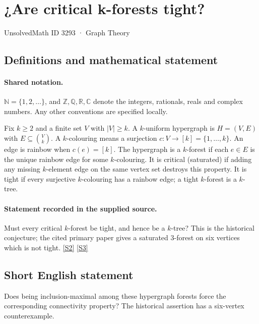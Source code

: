 \documentclass[11pt]{article}
\newcommand{\sref}[2]{\hyperlink{source:#1:#2}{[S#2]}}
\begin{document}
\setcounter{section}{3292}
\section{¿Are critical k-forests tight?}\label{3293}
{\small\sffamily UnsolvedMath ID 3293 · Graph Theory}
\subsection{Definitions and mathematical statement}

\paragraph{Shared notation.}$\mathbb N=\{1,2,\ldots\}$, and $\mathbb Z,\mathbb Q,\mathbb R,\mathbb C$ denote the integers, rationals, reals and complex numbers. Any other conventions are specified locally.


Fix $k\geq2$ and a finite set $V$ with $|V|\geq k$. A $k$-uniform hypergraph is $H=(V,E)$ with $E\subseteq\binom Vk$. A $k$-colouring means a surjection $c:V\to[k]=\{1,\ldots,k\}$. An edge is rainbow when $c(e)=[k]$. The hypergraph is a $k$-forest if each $e\in E$ is the unique rainbow edge for some $k$-colouring. It is critical (saturated) if adding any missing $k$-element edge on the same vertex set destroys this property. It is tight if every surjective $k$-colouring has a rainbow edge; a tight $k$-forest is a $k$-tree.
\paragraph{Statement recorded in the supplied source.}
Must every critical $k$-forest be tight, and hence be a $k$-tree? This is the historical conjecture; the cited primary paper gives a saturated $3$-forest on six vertices which is not tight. \sref{3293}{2} \sref{3293}{3}
\subsection{Short English statement}
Does being inclusion-maximal among these hypergraph forests force the corresponding connectivity property? The historical assertion has a six-vertex counterexample.
\end{document}
